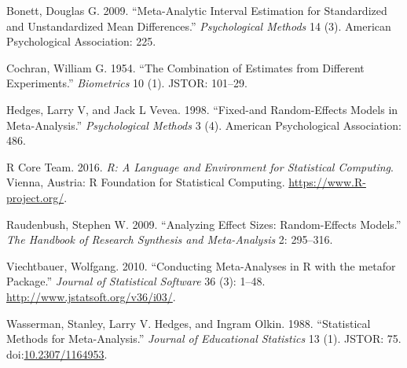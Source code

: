 \documentclass[]{elsarticle} %
\begin{document}
Bonett, Douglas G. 2009. ``Meta-Analytic Interval Estimation for
Standardized and Unstandardized Mean Differences.'' \emph{Psychological
Methods} 14 (3). American Psychological Association: 225.

Cochran, William G. 1954. ``The Combination of Estimates from Different
Experiments.'' \emph{Biometrics} 10 (1). JSTOR: 101--29.

Hedges, Larry V, and Jack L Vevea. 1998. ``Fixed-and Random-Effects
Models in Meta-Analysis.'' \emph{Psychological Methods} 3 (4). American
Psychological Association: 486.

R Core Team. 2016. \emph{R: A Language and Environment for Statistical
Computing}. Vienna, Austria: R Foundation for Statistical Computing.
\url{https://www.R-project.org/}.

Raudenbush, Stephen W. 2009. ``Analyzing Effect Sizes: Random-Effects
Models.'' \emph{The Handbook of Research Synthesis and Meta-Analysis} 2:
295--316.

Viechtbauer, Wolfgang. 2010. ``Conducting Meta-Analyses in R with the
metafor Package.'' \emph{Journal of Statistical Software} 36 (3): 1--48.
\url{http://www.jstatsoft.org/v36/i03/}.

Wasserman, Stanley, Larry V. Hedges, and Ingram Olkin. 1988.
``Statistical Methods for Meta-Analysis.'' \emph{Journal of Educational
Statistics} 13 (1). JSTOR: 75.
doi:\href{http://dx.doi.org/10.2307/1164953}{10.2307/1164953}.
\end{document}
